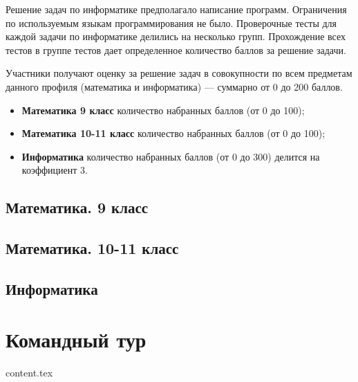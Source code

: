 \documentclass[a4paper,12pt,oneside]{book}
\begin{document}
Решение задач по информатике предполагало написание программ.
Ограничения по используемым языкам программирования не было.
Проверочные тесты для каждой задачи по информатике делились на
несколько групп. Прохождение всех тестов в группе тестов дает
определенное количество баллов за решение задачи.

Участники получают оценку за решение задач в совокупности по
всем предметам данного профиля (математика и информатика) ---
суммарно от 0 до 200 баллов.

\begin{itemize}
    \item {\bf Математика 9 класс} количество набранных баллов
    (от 0 до 100);
    \item {\bf Математика 10-11 класс} количество набранных баллов
    (от 0 до 100);
    \item {\bf Информатика} количество набранных баллов (от 0 до
    300) делится на коэффициент 3.
\end{itemize}

\section{Математика. 9 класс}


\section{Математика. 10-11 класс}


\section{Информатика}


\chapter{Командный тур}

{content.tex}


\end{document}
